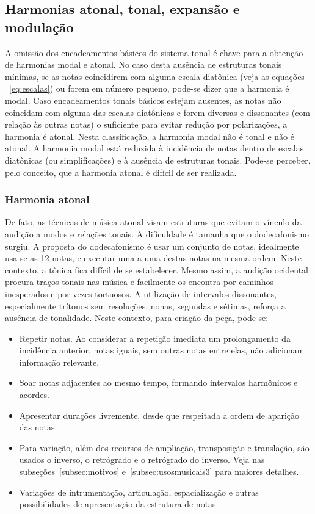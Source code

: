 \subsection{Harmonias atonal, tonal, expansão e modulação}\label{subsec:harmonia}
A omissão dos encadeamentos básicos do sistema tonal é chave para a obtenção de 
harmonias modal e atonal. No caso desta ausência de estruturas tonais mínimas,
se as notas coincidirem com alguma escala diatônica (veja as equações ~\ref{eq:escalas})
ou forem em número pequeno, pode-se dizer que a
harmonia é modal. Caso encadeamentos tonais básicos estejam ausentes, as notas não coincidam
com alguma das escalas diatônicas e forem diversas e dissonantes (com relação às outras notas) o suficiente para evitar redução por
polarizações, a harmonia é atonal.
Nesta classificação, a harmonia modal não é tonal e não é atonal.
A harmonia modal está reduzida à incidência de notas dentro de escalas diatônicas (ou simplificações) e à ausência de estruturas tonais.
Pode-se perceber, pelo conceito, que a harmonia atonal é difícil de ser realizada.\cite{harmEXT}

\subsubsection{Harmonia atonal}
De fato, as técnicas de música atonal
visam estruturas que evitam o vínculo da audição a modos e relações tonais. A
dificuldade é tamanha que o dodecafonismo surgiu. A proposta do dodecafonismo é
usar um conjunto de notas, idealmente usa-se as 12 notas, e executar uma a uma destas notas
na mesma ordem. Neste contexto, a tônica fica difícil de se estabelecer. Mesmo assim, a audição ocidental
procura traços tonais nas música e facilmente os encontra por caminhos inesperados e por vezes tortuosos.
A utilização de
intervalos dissonantes, especialmente trítonos sem resoluções, nonas, segundas e sétimas, reforça
a ausência de tonalidade. Neste contexto, para criação da peça, pode-se:
\begin{itemize}
    \item Repetir notas. Ao considerar a repetição imediata um prolongamento da incidência anterior, notas iguais, sem outras notas entre elas, não adicionam informação relevante.
    \item Soar notas adjacentes ao mesmo tempo, formando intervalos harmônicos e acordes.
    \item Apresentar durações livremente, desde que respeitada a ordem de aparição das notas.
    \item Para variação, além dos recursos de ampliação, transposição e translação, são usados o inverso, o retrógrado e o retrógrado do inverso. Veja nas subseções~\ref{subsec:motivos} e~\ref{subsec:usosmusicais3} para maiores detalhes.
    \item Variações de intrumentação, articulação, espacialização e outras possibilidades de apresentação da estrutura de notas.
\end{itemize}

